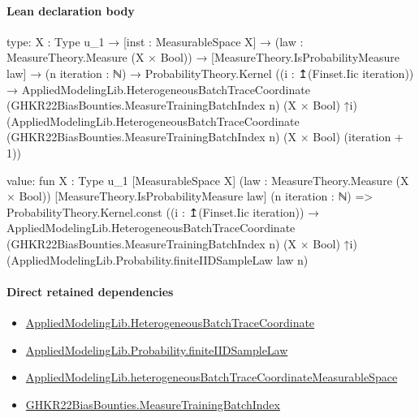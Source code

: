 \documentclass[10pt]{article}
\begin{document}
\paragraph{Lean declaration body}
\begin{ReviewVerbatim}
type:
{X : Type u_1} →
  [inst : MeasurableSpace X] →
    (law : MeasureTheory.Measure (X × Bool)) →
      [MeasureTheory.IsProbabilityMeasure law] →
        (n iteration : ℕ) →
          ProbabilityTheory.Kernel
            ((i : ↥(Finset.Iic iteration)) →
              AppliedModelingLib.HeterogeneousBatchTraceCoordinate (GHKR22BiasBounties.MeasureTrainingBatchIndex n)
                (X × Bool) ↑i)
            (AppliedModelingLib.HeterogeneousBatchTraceCoordinate (GHKR22BiasBounties.MeasureTrainingBatchIndex n)
              (X × Bool) (iteration + 1))

value:
fun {X : Type u_1} [MeasurableSpace X] (law : MeasureTheory.Measure (X × Bool)) [MeasureTheory.IsProbabilityMeasure law]
    (n iteration : ℕ) =>
  ProbabilityTheory.Kernel.const
    ((i : ↥(Finset.Iic iteration)) →
      AppliedModelingLib.HeterogeneousBatchTraceCoordinate (GHKR22BiasBounties.MeasureTrainingBatchIndex n) (X × Bool)
        ↑i)
    (AppliedModelingLib.Probability.finiteIIDSampleLaw law n)
\end{ReviewVerbatim}

\paragraph{Direct retained dependencies}
\begin{itemize}\raggedright
\item \hyperlink{governing-declaration-37d7ae049de215a7}{Applied\allowbreak{}Modeling\allowbreak{}Lib.\allowbreak{}Heterogeneous\allowbreak{}Batch\allowbreak{}Trace\allowbreak{}Coordinate}
\item \hyperlink{governing-declaration-91a777e8ba845265}{Applied\allowbreak{}Modeling\allowbreak{}Lib.\allowbreak{}Probability.\allowbreak{}finite\allowbreak{}IID\allowbreak{}Sample\allowbreak{}Law}
\item \hyperlink{governing-declaration-92d1582063c434f3}{Applied\allowbreak{}Modeling\allowbreak{}Lib.\allowbreak{}heterogeneous\allowbreak{}Batch\allowbreak{}Trace\allowbreak{}Coordinate\allowbreak{}Measurable\allowbreak{}Space}
\item \hyperlink{governing-declaration-dc25f678adad672d}{GHKR22\allowbreak{}Bias\allowbreak{}Bounties.\allowbreak{}Measure\allowbreak{}Training\allowbreak{}Batch\allowbreak{}Index}
\end{itemize}
\hypertarget{governing-declaration-51faa5483ff0d2f8}{}
\end{document}

